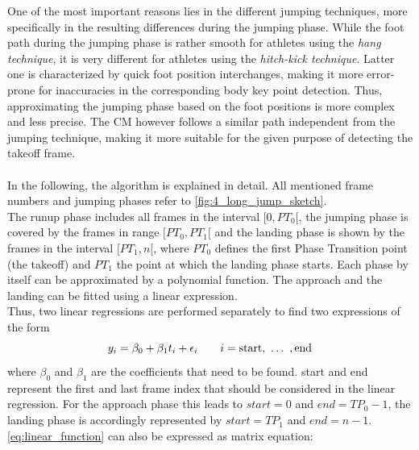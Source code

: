 One of the most important reasons lies in the different jumping techniques,
more specifically in the resulting differences during the jumping phase.
While the foot path during the jumping phase is rather smooth for
athletes using the \textit{hang technique}, it is very different for
athletes using the \textit{hitch-kick technique}.
Latter one is characterized by quick foot position interchanges, making it
more error-prone for inaccuracies in the corresponding body key point
detection.
Thus, approximating the jumping phase based on the foot positions is more
complex and less precise.
The \ac{CM} however follows a similar path independent from the jumping
technique, making it more suitable for the given purpose of detecting the
takeoff frame.\\\\
\noindent In the following, the algorithm is explained in detail.
All mentioned frame numbers and jumping phases refer to
\autoref{fig:4_long_jump_sketch}.\\
The runup phase includes all frames in the interval $[0, PT_0[$, the jumping
phase is covered by the frames in range $[PT_0, PT_1[$ and the landing phase
is shown by the frames in the interval $[PT_1, n[$, where $PT_0$ defines the
first Phase Transition point (the takeoff) and $PT_1$ the point at which the
landing phase starts.
Each phase by itself can be approximated by a polynomial function.
The approach and the landing can be fitted using a linear expression.\\
Thus, two linear regressions are performed separately to find two expressions
of the form
\begin{equation}\label{eq:linear_function}
    \\y_i = \beta_0 + \beta_1t_i + \epsilon_i
    \quad\quad
    i = \text{start},\ \dots\ ,\text{end}
\end{equation}
where $\beta_0$ and $\beta_1$ are the coefficients that need to be found.
start and end represent the first and last frame index that should be
considered in the linear regression.
For the approach phase this leads to $start = 0$ and $end = TP_0 - 1$, the
landing phase is accordingly represented by $start = TP_1$ and $end = n - 1$.\\
\autoref{eq:linear_function} can also be expressed as matrix equation:
